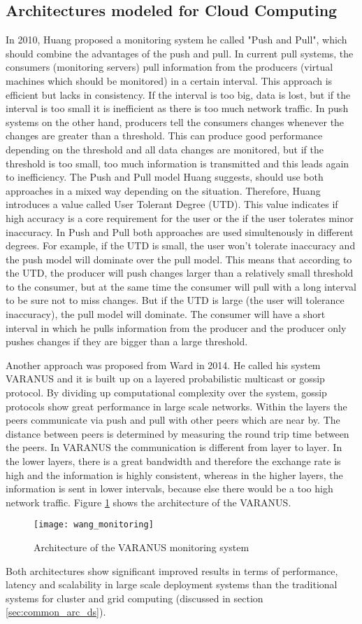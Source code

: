 \subsection{Architectures modeled for Cloud Computing}
In 2010, Huang \cite{He_2010} proposed a monitoring system he called "Push and Pull", which should combine the advantages of the push and pull. In current pull systems, the consumers (monitoring servers) pull information from the producers (virtual machines which should be monitored) in a certain interval. This approach is efficient but lacks in consistency. If the interval is too big, data is lost, but if the interval is too small it is inefficient as there is too much network traffic. In push systems on the other hand, producers tell the consumers changes whenever the changes are greater than a threshold. This can produce good performance depending on the threshold and all data changes are monitored, but if the threshold is too small, too much information is transmitted and this leads again to inefficiency. The Push and Pull model Huang suggests, should use both approaches in a mixed way depending on the situation. Therefore, Huang introduces a value called User Tolerant Degree (UTD). This value indicates if high accuracy is a core requirement for the user or the if the user tolerates minor inaccuracy. In Push and Pull both approaches are used simultenously in different degrees. For example, if the UTD is small, the user won't tolerate inaccuracy and the push model will dominate over the pull model. This means that according to the UTD, the producer will push changes larger than a relatively small threshold to the consumer, but at the same time the consumer will pull with a long interval to be sure not to miss changes. But if the UTD is large (the user will tolerance inaccuracy), the pull model will dominate. The consumer will have a short interval in which he pulls information from the producer and the producer only pushes changes if they are bigger than a large threshold.

Another approach was proposed from Ward \cite{Ward_2014} in 2014. He called his system VARANUS and it is built up on a layered probabilistic multicast or gossip protocol. By dividing up computational complexity over the system, gossip protocols show great performance in large scale networks. Within the layers the peers communicate via push and pull with other peers which are near by. The distance between peers is determined by measuring the round trip time between the peers. In VARANUS the communication is different from layer to layer. In the lower layers, there is a great bandwidth and therefore the exchange rate is high and the information is highly consistent, whereas in the higher layers, the information is sent in lower intervals, because else there would be a too high network traffic.
Figure \ref{fig:ward_varnus_architecture} shows the architecture of the VARANUS.
\begin{figure}
	\centering
		\texttt{[image: wang\_monitoring]}
	\caption{Architecture of the VARANUS monitoring system \cite{Ward_2014}}
	\label{fig:ward_varnus_architecture}
\end{figure}

Both architectures show significant improved results in terms of performance, latency and scalability in large scale deployment systems than the traditional systems for cluster and grid computing (discussed in section \ref{sec:common_arc_ds}).